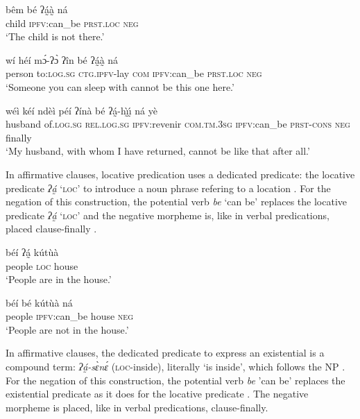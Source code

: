 \documentclass[output=paper,colorlinks=true, citecolor=brown]{langscibook}
\begin{document}
\ea\label{ex:gba:32}
    \gll bêm bé ʔá̰à̰  ná  \\ 
         child \textsc{ipfv}:can\_be \textsc{prst.loc} \textsc{neg} \\
    \glt ‘The child is not there.’
\z 

\ea\label{ex:gba:33}
    \gll wí héí mɔ́-ʔɔ̀ ʔîn bé ʔá̰à̰  ná \\ 
          person to:\textsc{log.sg} \textsc{ctg.ipfv}-lay \textsc{com} \textsc{ipfv}:can\_be \textsc{prst.loc} \textsc{neg}\\
    \glt ‘Someone you can sleep with cannot be this one here.’
\z 

\ea\label{ex:gba:34}
    \gll wéì kéí ndèì péí ʔínà bé ʔá̰-h\`{ı̰}\'{ı̰}  ná yè \\ 
         husband of.\textsc{log.sg} \textsc{rel.log.sg} \textsc{ipfv:}revenir \textsc{com.tm.3sg} \textsc{ipfv:}can\_be \textsc{prst-cons} \textsc{neg} finally \\
    \glt ‘My husband, with whom I have returned, cannot be like that after all.’
\z 

In affirmative clauses, locative predication uses a dedicated predicate: the locative predicate \textit{ʔá̰} ‘\textsc{loc}’ to introduce a noun phrase refering to a location . For the negation of this construction, the potential verb \textit{be} ‘can be’ replaces the locative predicate \textit{ʔá̰ } ‘\textsc{loc}’ and the negative morpheme is, like in verbal predications, placed clause-finally .


\ea\label{ex:gba:35}
    \gll béí ʔá̰  kútùà  \\ 
         people \textsc{loc} house \\
    \glt ‘People are in the house.’
\z 

\ea\label{ex:gba:36}
    \gll béí bé kútùà ná  \\ 
         people \textsc{ipfv}:can\_be house \textsc{neg} \\
        \glt ‘People are not in the house.’
\z 

In affirmative clauses, the dedicated predicate to express an existential is a compound term: \textit{ʔá̰-sɛ̀nɛ́} (\textsc{loc}-inside), literally ‘is inside’, which follows the NP . For the negation of this construction, the potential verb \textit{be} 'can be' replaces the existential predicate as it does for the locative predicate . The negative morpheme is placed, like in verbal predications, clause-finally.  
\end{document}
